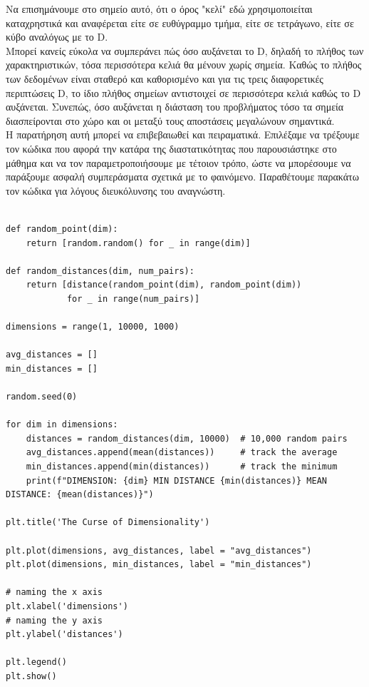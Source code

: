\documentclass[12pt]{article}
\begin{document}
Να επισημάνουμε στο σημείο αυτό, ότι ο όρος "κελί" εδώ χρησιμοποιείται καταχρηστικά και αναφέρεται είτε σε ευθύγραμμο τμήμα, είτε σε τετράγωνο, είτε σε κύβο αναλόγως με το D. \\

Μπορεί κανείς εύκολα να συμπεράνει πώς όσο αυξάνεται το D, δηλαδή το πλήθος των χαρακτηριστικών, τόσα περισσότερα κελιά θα μένουν χωρίς σημεία. Καθώς το πλήθος των δεδομένων είναι σταθερό και καθορισμένο και για τις τρεις διαφορετικές περιπτώσεις D, το ίδιο πλήθος σημείων αντιστοιχεί σε περισσότερα κελιά καθώς το D αυξάνεται. Συνεπώς, όσο αυξάνεται η διάσταση του προβλήματος τόσο τα σημεία διασπείρονται στο χώρο και οι μεταξύ τους αποστάσεις μεγαλώνουν σημαντικά. \\

Η παρατήρηση αυτή μπορεί να επιβεβαιωθεί και πειραματικά. Επιλέξαμε να τρέξουμε τον κώδικα που αφορά την κατάρα της διαστατικότητας που παρουσιάστηκε στο μάθημα και να τον παραμετροποιήσουμε με τέτοιον τρόπο, ώστε να μπορέσουμε να παράξουμε ασφαλή συμπεράσματα σχετικά με το φαινόμενο. Παραθέτουμε παρακάτω τον κώδικα για λόγους διευκόλυνσης του αναγνώστη. \\ 

\begin{lstlisting}

def random_point(dim):
	return [random.random() for _ in range(dim)]

def random_distances(dim, num_pairs):
	return [distance(random_point(dim), random_point(dim))
			for _ in range(num_pairs)]

dimensions = range(1, 10000, 1000)

avg_distances = []
min_distances = []

random.seed(0)

for dim in dimensions:
	distances = random_distances(dim, 10000)  # 10,000 random pairs
	avg_distances.append(mean(distances))     # track the average
	min_distances.append(min(distances))      # track the minimum
	print(f"DIMENSION: {dim} MIN DISTANCE {min(distances)} MEAN DISTANCE: {mean(distances)}")

plt.title('The Curse of Dimensionality') 

plt.plot(dimensions, avg_distances, label = "avg_distances")
plt.plot(dimensions, min_distances, label = "min_distances")

# naming the x axis 
plt.xlabel('dimensions') 
# naming the y axis 
plt.ylabel('distances')

plt.legend()     
plt.show()            
\end{lstlisting}
\end{document}
